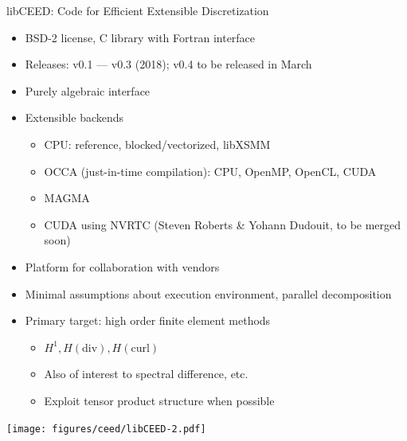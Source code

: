 \documentclass[aspectratio=1610]{beamer}
\begin{document}

\begin{frame}{libCEED: Code for Efficient Extensible Discretization}
  \begin{itemize}
  \item BSD-2 license, C library with Fortran interface
  \item Releases: v0.1 --- v0.3 (2018); v0.4 to be released in March
  \item Purely algebraic interface
  \item Extensible backends
    \begin{itemize}
    \item CPU: reference, blocked/vectorized, libXSMM
    \item OCCA (just-in-time compilation): CPU, OpenMP, OpenCL, CUDA
    \item MAGMA
    \item CUDA using NVRTC (Steven Roberts \& Yohann Dudouit, to be merged soon)
    \end{itemize}
  \item Platform for collaboration with vendors
  \item Minimal assumptions about execution environment, parallel decomposition
  \item Primary target: high order finite element methods
    \begin{itemize}
    \item $H^1, H(\mathrm{div}), H(\mathrm{curl})$
    \item Also of interest to spectral difference, etc.
    \item Exploit tensor product structure when possible
    \end{itemize}
  \end{itemize}
\end{frame}

\begin{frame}
  \texttt{[image: figures/ceed/libCEED-2.pdf]}
\end{frame}
\end{document}
